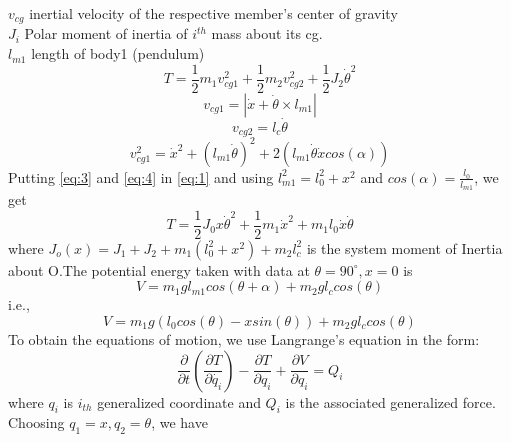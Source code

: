 \documentclass[12pt, a4paper]{article}
\begin{document}
$v_{cg}$ inertial velocity of the respective member’s center of gravity \\
$J_i$ Polar moment of inertia of $i^{th}$ mass about its cg. \\
$l_{m1}$ length of body1 (pendulum)\\
\begin{equation} \label{eq:1}
T = \frac{1}{2}m_1v_{cg1}^2 + \frac{1}{2}m_2v_{cg2}^2 + \frac{1}{2}J_2 \dot{\theta}^2
\end{equation}
\begin{equation}\label{eq:2}
v_{cg1} = |\dot{x} + \dot{\theta}\times l_{m1}|
\end{equation}
\begin{equation}\label{eq:3}
v_{cg2} = l_c \dot{\theta}
\end{equation}
\begin{equation}\label{eq:4}
v_{cg1}^2 = \dot{x}^2 + (l_{m1}\dot{\theta})^2 + 2(l_{m1}\dot{\theta}\dot{x}cos(\alpha))
\end{equation}
Putting \eqref{eq:3} and \eqref{eq:4} in \eqref{eq:1} and using $l_{m1}^2 = l_0^2 + x^2$ and $cos(\alpha) = \frac{l_0}{l_{m1}}$, we get \\
\begin{equation}\label{eq:5}
T = \frac{1}{2}J_0x\dot{\theta}^2 + \frac{1}{2}m_1\dot{x}^2 + m_1l_0\dot{x}\dot{\theta}
\end{equation}
where $J_o(x) = J_1 + J_2 + m_1(l_0^2 + x^2) + m_2l_c^2$ is the system moment of Inertia about O.The potential energy taken with data at $\theta = 90^{\circ},x = 0$ is \\
\begin{equation}\label{eq:6}
V = m_1gl_{m1}cos(\theta + \alpha) + m_2gl_ccos(\theta)
\end{equation}
i.e., \\
\begin{equation}\label{eq:7}
V = m_1g(l_0cos(\theta) - xsin(\theta)) + m_2gl_ccos(\theta)
\end{equation}
To obtain the equations of motion, we use Langrange's equation in the form: \\
\begin{equation}\label{eq:8}
\frac{\partial}{\partial t}(\frac{\partial T}{\partial \dot{q_i}}) - \frac{\partial T}{\partial q_i} + \frac{\partial V}{\partial q_i} = Q_i
\end{equation}
where $q_i$ is $i_{th}$ generalized coordinate and $Q_i$ is the associated generalized force. Choosing $q_1 = x,q_2 = \theta$, we have \\
\end{document}
